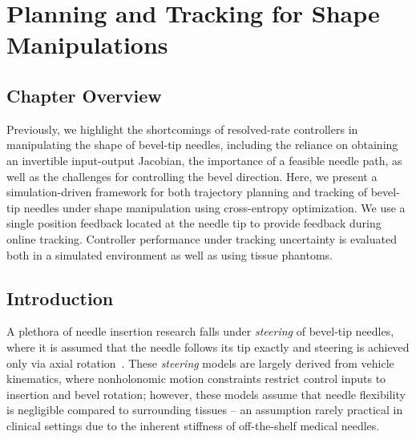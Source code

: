 \chapter{Planning and Tracking for Shape Manipulations} \label{chap:chap-5}

\section{Chapter Overview}
\label{sec:chap-5-overview}

Previously, we highlight the shortcomings of resolved-rate controllers in manipulating the shape of bevel-tip needles, including the reliance on obtaining an invertible input-output Jacobian, the importance of a feasible needle path, as well as the challenges for controlling the bevel direction. Here, we present a simulation-driven framework for both trajectory planning and tracking of bevel-tip needles under shape manipulation using cross-entropy optimization. We use a single position feedback located at the needle tip to provide feedback during online tracking. Controller performance under tracking uncertainty is evaluated both in a simulated environment as well as using tissue phantoms.

\section{Introduction}
\label{sec:chap-5-introduction}

A plethora of needle insertion research falls under \textit{steering} of bevel-tip needles, where it is assumed that the needle follows its tip exactly and steering is achieved only via axial rotation~\parencite{liReviewTechniquesUsed2022}. These \textit{steering} models are largely derived from vehicle kinematics, where nonholonomic motion constraints restrict control inputs to insertion and bevel rotation; however, these models assume that needle flexibility is negligible compared to surrounding tissues -- an assumption rarely practical in clinical settings due to the inherent stiffness of off-the-shelf medical needles.

